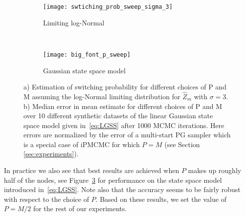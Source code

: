 \begin{figure}[t]
	\centering
	\begin{subfigure}[t]{0.4\textwidth}
		\texttt{[image: swtiching\_prob\_sweep\_sigma\_3]}
		\caption{Limiting log-Normal\label{fig:theSwitchingProb}}
	\end{subfigure}
	~~~~~~~~~~~
	\begin{subfigure}[t]{0.4\textwidth}
		\texttt{[image: big\_font\_p\_sweep]}
		\caption{Gaussian state space model\label{fig:Psweep}}
	\end{subfigure}
	\vspace{5pt}
	\caption{a) Estimation of switching probability for different choices of P and M assuming the log-Normal limiting distribution for $\hat{Z}_m$ with $\sigma=3$. b) Median error in mean estimate for different choices of P and M over 10 different synthetic datasets of the linear Gaussian state space model given in~\eqref{eq:LGSS} after 1000 MCMC iterations. Here errors are normalized by the error of a multi-start PG sampler which is a special case of iPMCMC for which $P=M$ (see Section \ref{sec:experiments}).
	}
\end{figure}

%
%

In practice we also see that best results are achieved when $P$ makes up roughly half of the nodes, see Figure~\ref{fig:Psweep} for performance on the state space model introduced in~\eqref{eq:LGSS}. Note also that the accuracy seems to be fairly robust with respect to the choice of $P$. %
%
Based on these results, we set the value of $P=M/2$ for the rest of our experiments.
